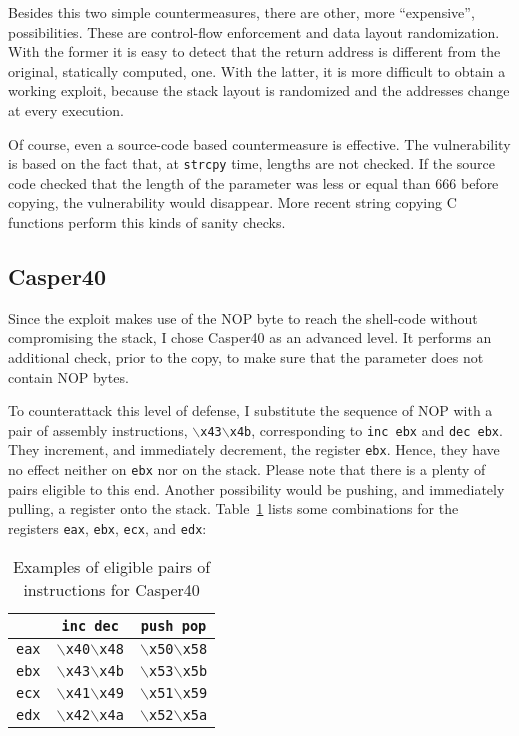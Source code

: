 Besides this two simple countermeasures, there are other, more ``expensive'', possibilities. These are control-flow enforcement and data layout randomization. With the former it is easy to detect that the return address is different from the original, statically computed, one. With the latter, it is more difficult to obtain a working exploit, because the stack layout is randomized and the addresses change at every execution.

Of course, even a source-code based countermeasure is effective. The vulnerability is based on the fact that, at \texttt{strcpy} time, lengths are not checked. If the source code checked that the length of the parameter was less or equal than 666 before copying, the vulnerability would disappear. More recent string copying C functions perform this kinds of sanity checks.

\subsection{Casper40}\label{sec:casper40}
Since the exploit makes use of the NOP byte to reach the shell-code without compromising the stack, I chose Casper40 as an advanced level. It performs an additional check, prior to the copy, to make sure that the parameter does not contain NOP bytes. 

To counterattack this level of defense, I substitute the sequence of NOP with a pair of assembly instructions, \texttt{$\backslash$x43$\backslash$x4b}, corresponding to \texttt{inc ebx} and \texttt{dec ebx}. They increment, and immediately decrement, the register \texttt{ebx}. Hence, they have no effect neither on \texttt{ebx} nor on the stack. Please note that there is a plenty of pairs eligible to this end. Another possibility would be pushing, and immediately pulling, a register onto the stack. Table~\ref{tbl:casper40} lists some combinations for the registers \texttt{eax}, \texttt{ebx}, \texttt{ecx}, and \texttt{edx}:
\begin{table}[h]
	\centering
	\begin{tabular}{|c|c|c|}
		\hline
		& \texttt{inc dec}                        & \texttt{push pop}                       \\ \hline
		\texttt{eax} & \texttt{$\backslash$x40$\backslash$x48} & \texttt{$\backslash$x50$\backslash$x58} \\ \hline
		\texttt{ebx} & \texttt{$\backslash$x43$\backslash$x4b} & \texttt{$\backslash$x53$\backslash$x5b} \\ \hline
		\texttt{ecx} & \texttt{$\backslash$x41$\backslash$x49} & \texttt{$\backslash$x51$\backslash$x59} \\ \hline
		\texttt{edx} & \texttt{$\backslash$x42$\backslash$x4a} & \texttt{$\backslash$x52$\backslash$x5a} \\ \hline
	\end{tabular}
	\caption{Examples of eligible pairs of instructions for Casper40}
	\label{tbl:casper40}
\end{table}

